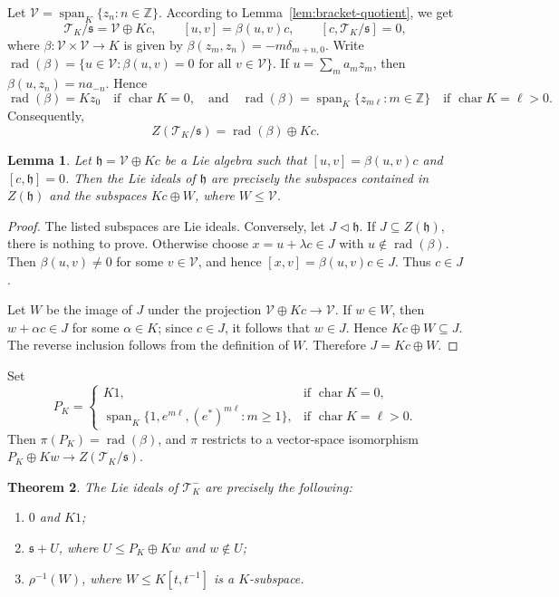 \documentclass[11pt]{article}
\numberwithin{equation}{section}
\theoremstyle{plain}
\newtheorem{theorem}{Theorem}[section]
\newtheorem{lemma}[theorem]{Lemma}
\theoremstyle{definition}
\numberwithin{equation}{section}
\newcommand{\T}{\mathscr T_K}
\newcommand{\Span}{\operatorname{span}_K}
\newcommand{\rad}{\operatorname{rad}}
\newcommand{\ch}{\operatorname{char}}
\begin{document}
Let $\mathcal V=\Span\{z_n:n\in\mathbb Z\}$. According to Lemma~\ref{lem:bracket-quotient}, we get
$$
\T/\mathfrak s=\mathcal V\oplus Kc,
\qquad [u,v]=\beta(u,v)c,\qquad [c,\T/\mathfrak s]=0,
$$
where $\beta:\mathcal V\times\mathcal V\to K$ is given by $\beta(z_m,z_n)=-m\delta_{m+n,0}$. Write $\rad(\beta)=\{u\in\mathcal V:\beta(u,v)=0\text{ for all }v\in\mathcal V\}$. If $u=\sum_m a_mz_m$, then $\beta(u,z_n)=na_{-n}$. Hence
$$
\rad(\beta)=Kz_0\quad\text{if }\operatorname{char}K=0,
\quad
\text{and}
\quad
\rad(\beta)=\Span\{z_{m\ell}:m\in\mathbb Z\}\quad\text{if }\operatorname{char}K=\ell>0.
$$
Consequently,
$$
Z(\T/\mathfrak s)=\rad(\beta)\oplus Kc.
$$

\begin{lemma}\label{lem:heisenberg-ideals}
Let $\mathfrak h=\mathcal V\oplus Kc$ be a Lie algebra such that $[u,v]=\beta(u,v)c$ and $[c,\mathfrak h]=0$. Then the Lie ideals of $\mathfrak h$ are precisely the subspaces contained in $Z(\mathfrak h)$ and the subspaces $Kc\oplus W$, where $W\leq\mathcal V$.
\end{lemma}

\begin{proof}
The listed subspaces are Lie ideals. Conversely, let $J\triangleleft\mathfrak h$. If $J\subseteq Z(\mathfrak h)$, there is nothing to prove. Otherwise choose $x=u+\lambda c\in J$ with $u\notin\rad(\beta)$. Then $\beta(u,v)\neq0$ for some $v\in\mathcal V$, and hence $[x,v]=\beta(u,v)c\in J$. Thus $c\in J$.

Let $W$ be the image of $J$ under the projection $\mathcal V\oplus Kc\to\mathcal V$. If $w\in W$, then $w+\alpha c\in J$ for some $\alpha\in K$; since $c\in J$, it follows that $w\in J$. Hence $Kc\oplus W\subseteq J$. The reverse inclusion follows from the definition of $W$. Therefore $J=Kc\oplus W$.
\end{proof}


Set
$$
P_K=
\begin{cases}
K1, & \text{if }\ch K=0,\\
\Span\{1,e^{m\ell},(e^*)^{m\ell}:m\geq1\}, & \text{if }\ch K=\ell>0.
\end{cases}
$$
Then $\pi(P_K)=\rad(\beta)$, and $\pi$ restricts to a vector-space isomorphism $P_K\oplus Kw\to Z(\T/\mathfrak s)$.

\begin{theorem}\label{thm:classification}
The Lie ideals of $\T^-$ are precisely the following:
\begin{enumerate}[label=\rm(\roman*)]
\item $0$ and $K1$;
\item $\mathfrak s+U$, where $U\leq P_K\oplus Kw$ and $w\notin U$;
\item $\rho^{-1}(W)$, where $W\leq K[t,t^{-1}]$ is a $K$-subspace.
\end{enumerate}
\end{theorem}
\end{document}
